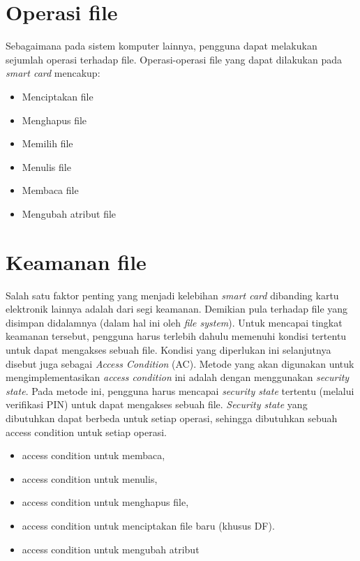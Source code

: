 \documentclass[a4paper, 12pt]{report}
\begin{document}
\section{Operasi file}
\label{file-operation}

Sebagaimana pada sistem komputer lainnya, pengguna dapat melakukan sejumlah operasi terhadap file. Operasi-operasi file yang dapat dilakukan pada \textsl{smart card} mencakup:

\begin{itemize}
\item Menciptakan file
\item Menghapus file
\item Memilih file
\item Menulis file
\item Membaca file
\item Mengubah atribut file
\end{itemize}

\section{Keamanan file}
\label{file-security}

Salah satu faktor penting yang menjadi kelebihan \textsl{smart card} dibanding kartu elektronik lainnya adalah dari segi keamanan. Demikian pula terhadap file yang disimpan didalamnya (dalam hal ini oleh \emph{file system}). Untuk mencapai tingkat keamanan tersebut, pengguna harus terlebih dahulu memenuhi kondisi tertentu untuk dapat mengakses sebuah file. Kondisi yang diperlukan ini selanjutnya disebut juga sebagai \emph{Access Condition} (AC). Metode yang akan digunakan untuk mengimplementasikan \emph{access condition} ini adalah dengan menggunakan \emph{security state}. Pada metode ini, pengguna harus mencapai \emph{security state} tertentu (melalui verifikasi PIN) untuk dapat mengakses sebuah file. \emph{Security state} yang dibutuhkan dapat berbeda untuk setiap operasi, sehingga dibutuhkan sebuah access condition untuk setiap operasi. 

\begin{itemize}
\item access condition untuk membaca,
\item access condition untuk menulis,
\item access condition untuk menghapus file,
\item access condition untuk menciptakan file baru (khusus DF).
\item access condition untuk mengubah atribut
\end{itemize}
\end{document}

